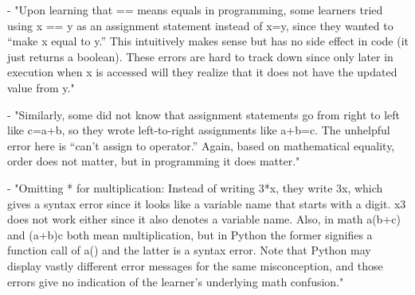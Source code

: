 - "Upon learning that == means equals in programming, some learners tried using x == y as an assignment statement instead of x=y, since they wanted to “make x equal to y.” This intuitively makes sense but has no side effect in code (it just returns a boolean). These errors are hard to track down since only later in execution when x is accessed will they realize that it does not have the updated value from y." \parencite{GuoMarkelZhang2020}

- "Similarly, some did not know that assignment statements go from right to left like c=a+b, so they wrote left-to-right assignments like a+b=c. The unhelpful error here is “can’t assign to operator.” Again, based on mathematical equality, order does not matter, but in programming it does matter." \parencite{GuoMarkelZhang2020}

- "Omitting * for multiplication: Instead of writing 3*x, they write 3x, which gives a syntax error since it looks like a variable name that starts with a digit. x3 does not work either since it also denotes a variable name. Also, in math a(b+c) and (a+b)c both mean multiplication, but in Python the former signifies a function call of a() and the latter is a syntax error. Note that Python may display vastly different error messages for the same misconception, and those errors give no indication of the learner’s underlying math confusion." \parencite{GuoMarkelZhang2020}

